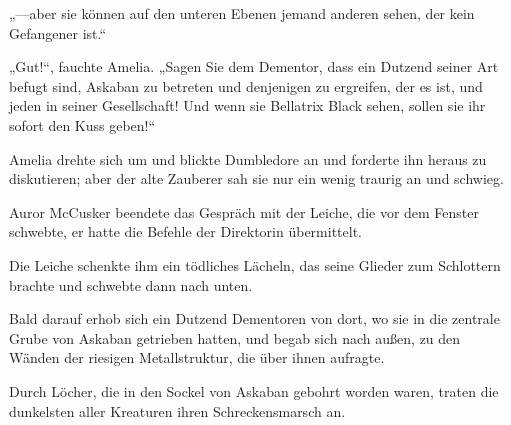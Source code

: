 „—aber sie können auf den unteren Ebenen jemand anderen sehen, der kein Gefangener ist.“

„Gut!“, fauchte Amelia. „Sagen Sie dem Dementor, dass ein Dutzend seiner Art befugt sind, Askaban zu betreten und denjenigen zu ergreifen, der es ist, und jeden in seiner Gesellschaft! Und wenn sie Bellatrix Black sehen, sollen sie ihr sofort den Kuss geben!“

Amelia drehte sich um und blickte Dumbledore an und forderte ihn heraus zu diskutieren; aber der alte Zauberer sah sie nur ein wenig traurig an und schwieg.

\later

Auror McCusker beendete das Gespräch mit der Leiche, die vor dem Fenster schwebte, er hatte die Befehle der Direktorin übermittelt.

Die Leiche schenkte ihm ein tödliches Lächeln, das seine Glieder zum Schlottern brachte und schwebte dann nach unten.

Bald darauf erhob sich ein Dutzend Dementoren von dort, wo sie in die zentrale Grube von Askaban getrieben hatten, und begab sich nach außen, zu den Wänden der riesigen Metallstruktur, die über ihnen aufragte.

Durch Löcher, die in den Sockel von Askaban gebohrt worden waren, traten die dunkelsten aller Kreaturen ihren Schreckensmarsch an.


